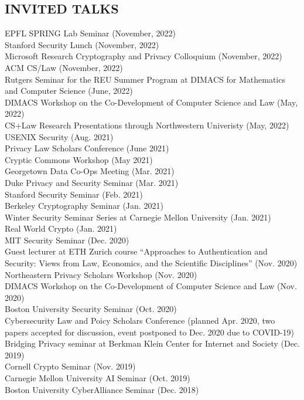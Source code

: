 \documentclass{res}
\begin{document}
\begin{resume}
\section{INVITED TALKS}
\vspace{0.1in}
EPFL SPRING Lab Seminar (November, 2022) \\
Stanford Security Lunch (November, 2022) \\
Microsoft Research Cryptography and Privacy Colloquium (November, 2022) \\
ACM CS/Law (November, 2022) \\
Rutgers Seminar for the REU Summer Program at DIMACS for Mathematics and Computer Science (June, 2022) \\
DIMACS Workshop on the Co-Development of Computer Science and Law (May, 2022) \\
CS+Law Research Presentations through Northwestern Univeristy (May, 2022) \\
USENIX Security (Aug. 2021) \\
Privacy Law Scholars Conference (June 2021) \\
Cryptic Commons Workshop (May 2021) \\
Georgetown Data Co-Ops Meeting (Mar. 2021) \\
Duke Privacy and Security Seminar (Mar. 2021) \\
Stanford Security Seminar (Feb. 2021) \\
Berkeley Cryptography Seminar (Jan. 2021) \\
Winter Security Seminar Series at Carnegie Mellon University (Jan. 2021) \\
Real World Crypto (Jan. 2021) \\
MIT Security Seminar (Dec. 2020) \\
Guest lecturer at ETH Zurich course ``Approaches to Authentication and Security: Views from Law,
Economics, and the Scientific Disciplines'' (Nov. 2020) \\
Northeastern Privacy Scholars Workshop (Nov. 2020) \\
DIMACS Workshop on the Co-Development of Computer Science and Law (Nov. 2020) \\
Boston University Security Seminar (Oct. 2020) \\
Cybersecurity Law and Poicy Scholars Conference (planned Apr. 2020, two papers accepted for
discussion, event postponed to Dec. 2020 due to COVID-19) \\
Bridging Privacy seminar at Berkman Klein Center for Internet and Society (Dec. 2019) \\ 
Cornell Crypto Seminar (Nov. 2019) \\
Carnegie Mellon University AI Seminar (Oct. 2019) \\
Boston University CyberAlliance Seminar (Dec. 2018) \\


\end{resume}
\end{document}
